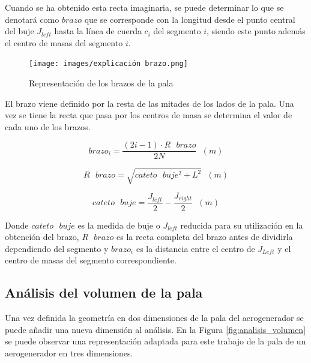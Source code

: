 Cuando se ha obtenido esta recta imaginaria, se puede determinar lo que se denotará como $brazo$ que se corresponde con la longitud desde el punto central del buje $J_{left}$ hasta la línea de cuerda $c_{i}$ del segmento $i$, siendo este punto además el centro de masas del segmento $i$.\\


    \begin{figure}[H]
    \centering
    \texttt{[image: images/explicación brazo.png]}
    \caption{Representación de los brazos de la pala}
    \label{fig:exp_brazo}
\end{figure}

El brazo viene definido por la resta de las mitades de los lados de la pala. Una vez se tiene la recta que pasa por los centros de masa se determina el valor de cada uno de los brazos.

\begin{equation}
brazo_i = \dfrac{(2i -1) \cdot R \text{ } brazo}{2N} \hspace{7pt} (m)
\end{equation}

\begin{equation}
R \text{ } brazo = \sqrt{cateto \text{ } buje^{2} + L^{2}} \hspace{7pt} (m)
\end{equation}

\begin{equation}
cateto \text{ } buje = \dfrac{J_{left}}{2} - \dfrac{J_{right}}{2} \hspace{7pt} (m)
\end{equation}


Donde $cateto \text{ } buje$ es la medida de buje o $J_{left}$ reducida para su utilización en la obtención del brazo, $R \text{ } brazo$ es la recta completa del brazo antes de dividirla dependiendo del segmento y $brazo_i$ es la distancia entre el centro de $J_{Left}$ y el centro de masas del segmento correspondiente.

\subsection{Análisis del volumen de la pala}
\label{section:volumen_pala}

Una vez definida la geometría en dos dimensiones de la pala del aerogenerador se puede añadir una nueva dimensión al análisis. En la Figura \ref{fig:analisis_volumen} se puede observar una representación adaptada para este trabajo de la pala de un aerogenerador en tres dimensiones.

